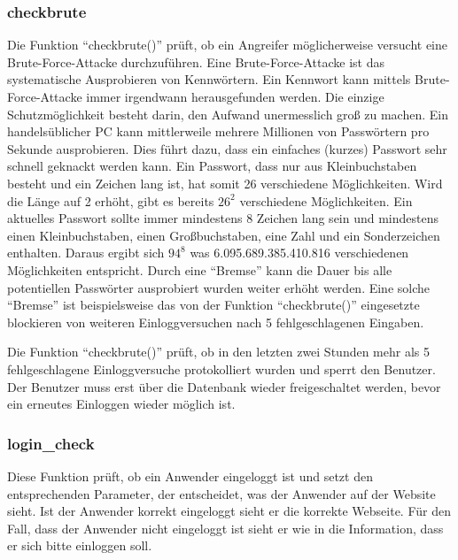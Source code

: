 \subsubsection{checkbrute}
Die Funktion "`checkbrute()"' prüft, ob  ein Angreifer möglicherweise versucht eine Brute-Force-Attacke durchzuführen. Eine Brute-Force-Attacke ist das systematische Ausprobieren von Kennwörtern. Ein Kennwort kann mittels Brute-Force-Attacke immer irgendwann herausgefunden werden. Die einzige Schutzmöglichkeit besteht darin, den Aufwand unermesslich groß zu machen. Ein handelsüblicher PC kann mittlerweile mehrere Millionen von Passwörtern pro Sekunde ausprobieren. Dies führt dazu, dass ein einfaches (kurzes) Passwort sehr schnell geknackt werden kann. Ein Passwort, dass nur aus Kleinbuchstaben besteht und ein Zeichen lang ist, hat somit 26 verschiedene Möglichkeiten. Wird die Länge auf 2 erhöht, gibt es bereits $26^2$ verschiedene Möglichkeiten. Ein aktuelles Passwort sollte immer mindestens 8 Zeichen lang sein und mindestens einen Kleinbuchstaben, einen Großbuchstaben, eine Zahl und ein Sonderzeichen enthalten. Daraus ergibt sich $94^8$ was 6.095.689.385.410.816 verschiedenen Möglichkeiten entspricht. Durch eine "`Bremse"' kann die Dauer bis alle potentiellen Passwörter ausprobiert wurden weiter erhöht werden. Eine solche "`Bremse"' ist beispielsweise das von der Funktion "`checkbrute()"' eingesetzte blockieren von weiteren Einloggversuchen nach 5 fehlgeschlagenen Eingaben.

Die Funktion "`checkbrute()"' prüft, ob in den letzten zwei Stunden mehr als 5 fehlgeschlagene Einloggversuche protokolliert wurden und sperrt den Benutzer. Der Benutzer muss erst über die Datenbank wieder freigeschaltet werden, bevor ein erneutes Einloggen wieder möglich ist.

\subsubsection{login\_check}
Diese Funktion prüft, ob ein Anwender eingeloggt ist und setzt den entsprechenden
Parameter, der entscheidet, was der Anwender auf der Website sieht. Ist der Anwender korrekt eingeloggt sieht er die korrekte Webseite. Für den Fall, dass der Anwender nicht eingeloggt ist sieht er wie in  die Information, dass er sich bitte einloggen soll.

